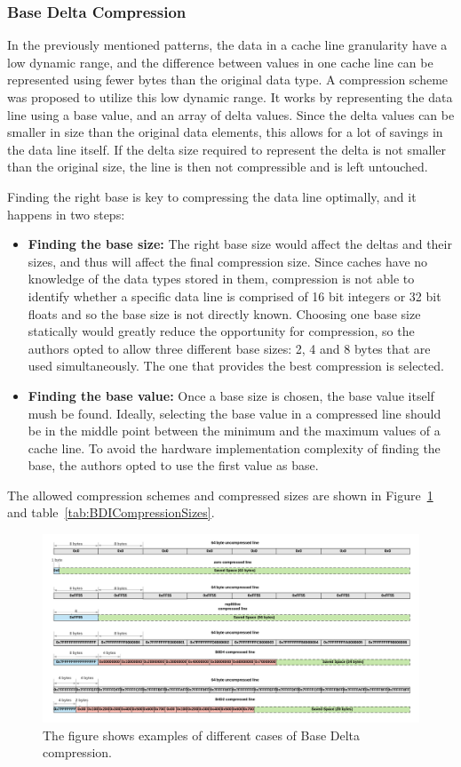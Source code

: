 \subsubsection{Base Delta Compression}
In the previously mentioned patterns, the data in a cache line granularity have a low dynamic range, and the difference between values in one cache line can be represented using fewer bytes than the original data type. A compression scheme was proposed to utilize this low dynamic range. It works by representing the data line using a base value, and an array of delta values. Since the delta values can be smaller in size than the original data elements, this allows for a lot of savings in the data line itself. If the delta size required to represent the delta is not smaller than the original size, the line is then not compressible and is left untouched.\par
Finding the right base is key to compressing the data line optimally, and it happens in two steps:
\begin{itemize}
    \item \textbf{Finding the base size:} The right base size would affect the deltas and their sizes, and thus will affect the final compression size. Since caches have no knowledge of the data types stored in them, compression is not able to identify whether a specific data line is comprised of 16 bit integers or 32 bit floats and so the base size is not directly known. Choosing one base size statically would greatly reduce the opportunity for compression, so the authors opted to allow three different base sizes: 2, 4 and 8 bytes that are used simultaneously. The one that provides the best compression is selected.
    \item \textbf{Finding the base value:} Once a base size is chosen, the base value itself mush be found. Ideally, selecting the base value in a compressed line should be in the middle point between the minimum and the maximum values of a cache line. To avoid the hardware implementation complexity of finding the base, the authors opted to use the first value as base.
\end{itemize}
The allowed compression schemes and compressed sizes are shown in Figure~\ref{fig:BaseDeltaCompression} and table~\ref{tab:BDICompressionSizes}.
\begin{figure}
    \includegraphics[width=\textwidth]{BaseDeltaCompression.pdf}
    \caption[Base Delta Compression Examples]{The figure shows examples of different cases of Base Delta compression.}
    \label{fig:BaseDeltaCompression}
\end{figure}
